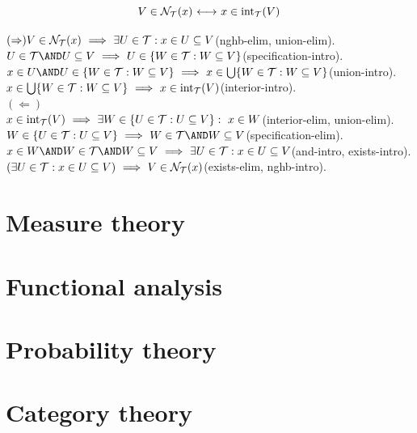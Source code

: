\newcommand*{\blipo}{\separation{W}{\topology}{W\subseteq V}}
\begin{theorem}
\[
V\in\mathcal{N}_{\mathcal{T}}(x) {\ \longleftrightarrow\ } x\in \mathrm{int}_{\mathcal{T}}(V)
\]
\end{theorem}
\Proof
$(\Rightarrow)\\
V\in \mathcal{N}_{\mathcal{T}}(x) \ \Longrightarrow\  \exists U\in \mathcal{T}: x\in U \subseteq V$\hfill(nghb-elim, union-elim).
\\
$U\in\topology\AND U\subseteq V \IMPLIES U \in \blipo $\hfill(specification-intro).
\\
$x\in U \AND U \in \blipo \IMPLIES x\in \union \blipo$\hfill(union-intro).
\\
$x\in \union \blipo \IMPLIES x\in \interior_\topology(V)$\hfill(interior-intro).
\\
$(\Leftarrow)$
\\
$x\in \mathrm{int}_{\mathcal{T}}(V) \ \Longrightarrow\  \exists W\in  \{U\in\mathcal{T} :U\subseteq V\}:\ x\in W$\hfill(interior-elim, union-elim).
\\
$W\in  \{U\in\topology:U\subseteq V\} \IMPLIES W\in\topology\AND W\subseteq V$\hfill(specification-elim).
\\
$x\in W\AND W\in\topology\AND W\subseteq V \IMPLIES \exists U\in \topology: x\in U \subseteq V$\hfill(and-intro, exists-intro).
\\
$(\exists U\in \mathcal{T}: x\in U \subseteq V) \ \Longrightarrow\  V\in \mathcal{N}_{\mathcal{T}}(x)$\hfill(exists-elim, nghb-intro).
\\
\Done
\section{Measure theory}
\section{Functional analysis}
\section{Probability theory}
\section{Category theory}

